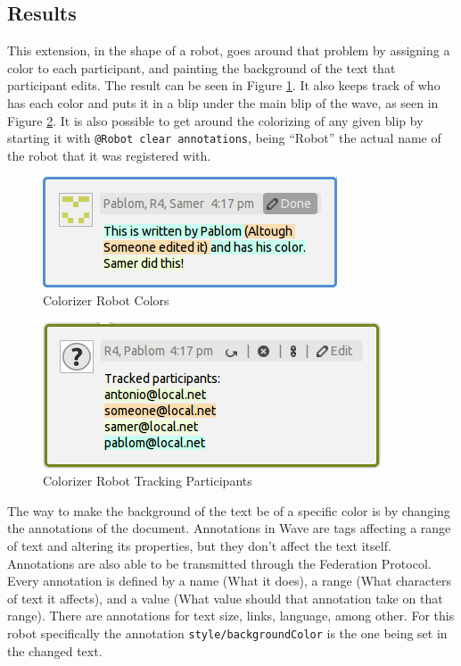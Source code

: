 \subsection{Results}
This extension, in the shape of a robot, goes around that problem by assigning a color to each participant, and painting the background of the text that participant edits. The result can be seen in Figure \ref{fig:colorizer_editions}. It also keeps track of who has each color and puts it in a blip under the main blip of the wave, as seen in Figure \ref{fig:colorizer_editors}. It is also possible to get around the colorizing of any given blip by starting it with \verb|@Robot clear annotations|, being ``Robot'' the actual name of the robot that it was registered with.\\[.2cm]
\begin{figure}[H]
  \center
    \includegraphics[keepaspectratio, scale=0.8]{Media/Captures/Extensions/Colorizer/ColorizerEditions.png}
  \caption{Colorizer Robot Colors}
  \label{fig:colorizer_editions}
\end{figure}
\begin{figure}[h]
  \center
    \includegraphics[keepaspectratio, scale=0.7]{Media/Captures/Extensions/Colorizer/ColorizerEditors.png}
  \caption{Colorizer Robot Tracking Participants}
  \label{fig:colorizer_editors}
\end{figure}
The way to make the background of the text be of a specific color is by changing the annotations of the document. Annotations in Wave are tags affecting a range of text and altering its properties, but they don't affect the text itself. Annotations are also able to be transmitted through the Federation Protocol. Every annotation is defined by a name (What it does), a range (What characters of text it affects), and a value (What value should that annotation take on that range). There are annotations for text size, links, language, among other. For this robot specifically the annotation \verb|style/backgroundColor| is the one being set in the changed text.\\[.2cm]
